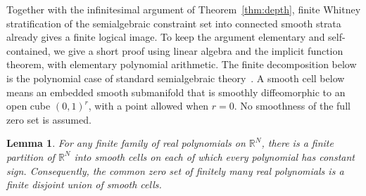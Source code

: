 \documentclass[aps,prl,reprint,notitlepage,nofootinbib,nobibnotes]{revtex4-2}
\newtheorem{lemma}{Lemma}
\begin{document}
Together with the infinitesimal argument of Theorem~\ref{thm:depth},
finite Whitney stratification of the semialgebraic constraint set into
connected smooth strata already gives a finite logical image.
To keep the argument elementary and self-contained, we give a short proof
using linear algebra and the implicit function theorem, with elementary
polynomial arithmetic. The finite decomposition below is the polynomial
case of standard semialgebraic theory~\cite{Plaumann}.
A smooth cell below means an
embedded smooth submanifold that is smoothly diffeomorphic to an open
cube \((0,1)^r\), with a point allowed
when \(r=0\). No smoothness of the full zero set is assumed.

\begin{lemma}\label{lem:finite-smooth-decomposition}
For any finite family of real polynomials on \(\mathbb R^N\), there is a
finite partition of \(\mathbb R^N\) into smooth cells on each of which
every polynomial has constant sign. Consequently, the common zero set
of finitely many real polynomials is a finite disjoint union of smooth
cells.
\end{lemma}
\end{document}
